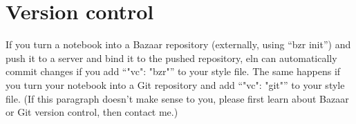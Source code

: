 \documentclass[11pt]{report}
\begin{document}
\section{Version control}

If you turn a notebook into a Bazaar repository (externally, using
``bzr init'') and push it to a server and bind it to the pushed
repository, eln can automatically commit changes if you add ``"vc":
"bzr"'' to your style file. The same happens if you turn your notebook
into a Git repository and add ``"vc": "git"'' to your style file. (If
this paragraph doesn't make sense to you, please first learn about
Bazaar or Git version control, then contact me.)
\end{document}
